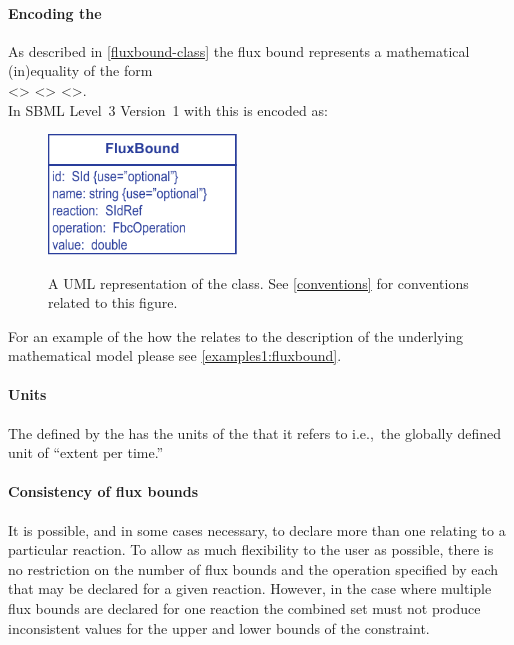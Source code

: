\paragraph{Encoding the \FluxBound}
As described in \ref{fluxbound-class} the flux bound represents a
mathematical (in)equality of the form\\ <> <>
<>.\\ In SBML Level~3 Version~1 with \FBC this is encoded as:
%
%
%
\begin{figure}[h!]
  \centering
  \includegraphics[width=5cm]{images/fbc_uml_fbnd.pdf}\\
  \caption{A UML representation of the \FBCPackage \FluxBound class. See
  \ref{conventions} for conventions related to this figure.}
  \label{fig:fbc_uml_fbnd}
\end{figure}
%
For an example of the how the \FluxBound relates to the description of the underlying mathematical model please see \ref{examples1:fluxbound}.

\paragraph{Units}
The  defined by the \FluxBound has the units of the  that it refers to i.e.,~the globally defined unit of ``extent per time.''

\paragraph{Consistency of flux bounds}

It is possible, and in some cases necessary, to declare more than one
\FluxBound relating to a particular reaction. To allow as much
flexibility to the user as possible, there is no restriction on the
number of flux bounds and the operation specified by each that may be
declared for a given reaction. However, in the case where multiple
flux bounds are declared for one reaction the combined set must not
produce inconsistent values for the upper and lower bounds of the
constraint.

